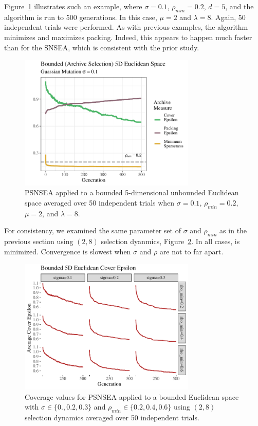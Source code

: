 \documentclass[twoside]{article}
\begin{document}
Figure~\ref{fig:bounded:mu2lam8:0102} illustrates such an example, where $\sigma=0.1$, $\rho_{min}= 0.2$, $d=5$, and the algorithm is run to 500 generations.  In this case, $\mu=2$ and $\lambda=8$.  Again, 50 independent trials were performed.  As with previous examples, the algorithm minimizes  and maximizes packing.  Indeed, this appears to happen much faster than for the SNSEA, which is consistent with the prior study.
%
\begin{figure}[h]
  \center\includegraphics[width=0.75\textwidth]{Figures/bounded-500-s01r02-mu2lam8.pdf}
  \caption{\label{fig:bounded:mu2lam8:0102} PSNSEA applied to a bounded 5-dimensional unbounded Euclidean space averaged over 50 independent trials when $\sigma=0.1$, $\rho_{min}=0.2$, $\mu=2$, and $\lambda=8$.}
\end{figure}

For consistency, we examined the same parameter set of $\sigma$ and $\rho_{min}$ as in the previous section using $(2,8)$ selection dyanmics, Figure~\ref{fig:bounded:mu2lam8:sm}.  In all cases,  is minimized.  Convergence is slowest when $\sigma$ and $\rho$ are not to far apart.
%
\begin{figure}[t]
  \center\includegraphics[width=0.75\textwidth]{Figures/bounded-500-sm-mu2lam8.pdf}
  \caption{\label{fig:bounded:mu2lam8:sm} Coverage values for PSNSEA applied to a bounded Euclidean space with $\sigma\in\{0.,  0.2, 0.3\}$ and $\rho_{min} \in \{0.2, 0.4, 0.6\}$ using $(2,8)$ selection dynamics averaged over 50 independent trials.}
\end{figure}
\end{document}
